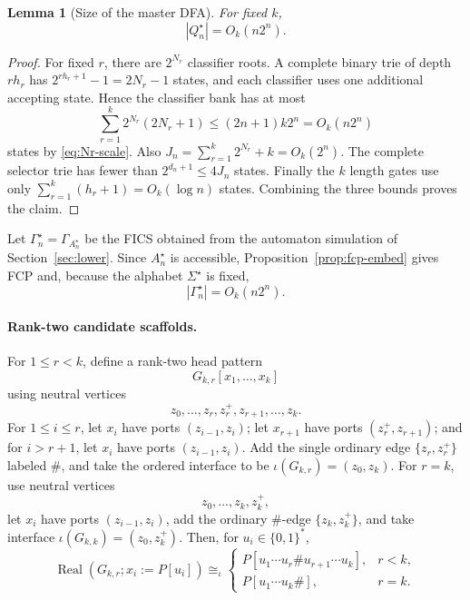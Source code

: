 \documentclass[11pt]{article}
\newtheorem{lemma}[theorem]{Lemma}
\theoremstyle{definition}
\theoremstyle{remark}
\newcommand{\Real}{\operatorname{Real}}
\begin{document}
\begin{lemma}[Size of the master DFA]
\label{lem:master-dfa-size}
For fixed \(k\),
\[
|Q_n^\star|
=
O_k(n2^n).
\]
\end{lemma}

\begin{proof}
For fixed \(r\), there are \(2^{N_r}\) classifier roots.  A complete binary
trie of depth \(rh_r\) has
\(2^{rh_r+1}-1 = 2N_r-1\)
states, and each classifier uses one additional accepting state.  Hence the
classifier bank has at most
\[
\sum_{r=1}^k 2^{N_r}(2N_r+1)
\le
(2n+1)k2^n
=
O_k(n2^n)
\]
states by \eqref{eq:Nr-scale}.  Also
\(J_n = \sum_{r=1}^k2^{N_r}+k = O_k(2^n).\)
The complete selector trie has fewer than \(2^{d_n+1}\le4J_n\) states.
Finally the \(k\) length gates use only
\(\sum_{r=1}^k(h_r+1)=O_k(\log n)\)
states.  Combining the three bounds proves the claim.
\end{proof}

Let
\(\Gamma_n^\star=\Gamma_{A_n^\star}\)
be the FICS obtained from the automaton simulation of
Section~\ref{sec:lower}.  Since \(A_n^\star\) is accessible,
Proposition~\ref{prop:fcp-embed} gives FCP and, because the alphabet
\(\Sigma^\star\) is fixed,
\begin{equation}
\label{eq:master-fics-size}
|\Gamma_n^\star|
=
O_k(n2^n).
\end{equation}

\paragraph{Rank-two candidate scaffolds.}
For \(1\le r<k\), define a rank-two head pattern
\[
G_{k,r}[x_1,\ldots,x_k]
\]
using neutral vertices
\[
z_0,\ldots,z_r,z_r^+,z_{r+1},\ldots,z_k.
\]
For \(1\le i\le r\), let \(x_i\) have ports
\((z_{i-1},z_i)\); let \(x_{r+1}\) have ports
\((z_r^+,z_{r+1})\); and for \(i>r+1\), let \(x_i\) have ports
\((z_{i-1},z_i)\).  Add the single ordinary edge
\(\{z_r,z_r^+\}\) labeled \(\#\), and take the ordered interface to be
\(\iota(G_{k,r})=(z_0,z_k).\)
For \(r=k\), use neutral vertices
\[
z_0,\ldots,z_k,z_k^+,
\]
let \(x_i\) have ports \((z_{i-1},z_i)\), add the ordinary
\(\#\)-edge \(\{z_k,z_k^+\}\), and take interface
\(\iota(G_{k,k})=(z_0,z_k^+).\)
Then, for \(u_i\in\{0,1\}^\ast\),
\begin{equation}
\label{eq:ranktwo-scaffold-realization}
\Real(G_{k,r};x_i:=P[u_i])
\cong_\iota
\begin{cases}
P[u_1\cdots u_r\#u_{r+1}\cdots u_k],&r<k,\\[1mm]
P[u_1\cdots u_k\#],&r=k.
\end{cases}
\end{equation}
\end{document}
